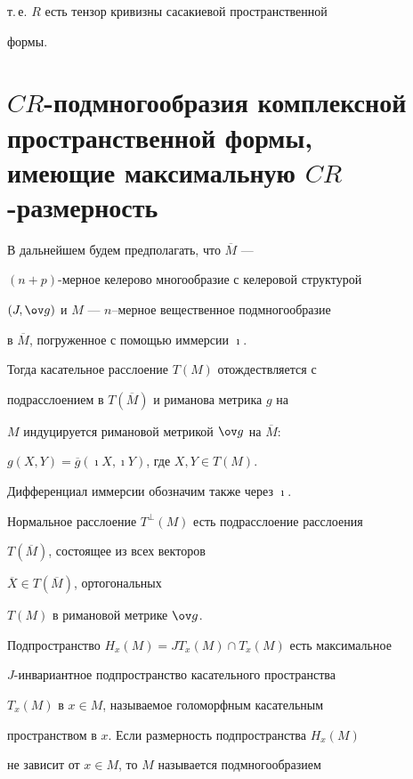 т.\,е. $R$ есть тензор кривизны сасакиевой пространственной


формы.








\section{$CR$-подмногообразия комплексной пространственной формы,\protect\\


имеющие максимальную $CR$-размерность}








В дальнейшем будем предполагать, что $\overline M$ ---


$(n+p)$-мерное келерово многообразие с келеровой структурой


$(J,\ov g)$ и  $M$ --- $n$--мерное вещественное подмногообразие


в $\overline M$, погруженное с помощью иммерсии $\imath$.


Тогда касательное расслоение $T(M)$ отождествляется с


подрасслоением в $T(\overline M)$ и риманова метрика $g$ на


$M$ индуцируется  римановой метрикой $\ov g$ на $\overline M$:


$g(X,Y)=\overline g(\imath X,\imath Y)$, где $X,Y\in T(M)$.


Дифференциал иммерсии обозначим также через $\imath$.


Нормальное расслоение $T^\perp(M)$ есть подрасслоение расслоения


$T(\overline M)$, состоящее из всех векторов


$\overline X\in T(\overline M)$, ортогональных


$T(M)$ в римановой метрике $\ov g$.





Подпространство $H_x(M)=JT_x(M) \cap T_x(M)$ есть максимальное


$J$-инвариантное подпространство касательного пространства


$T_x(M)$ в $x\in M$, называемое голоморфным касательным


пространством в $x$. Если размерность подпространства $H_x(M)$


не зависит от $x \in M$, то $M$ называется подмногообразием


